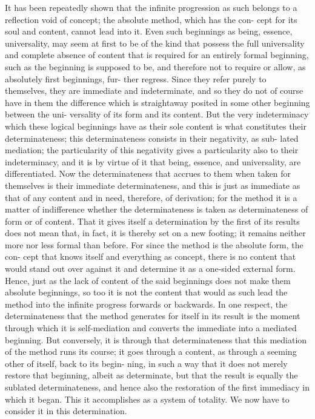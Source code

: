 It has been repeatedly shown that the infinite progression as such belongs
to a reflection void of concept; the absolute method, which has the con-
cept for its soul and content, cannot lead into it. Even such beginnings as
being, essence, universality, may seem at first to be of the kind that possess
the full universality and complete absence of content that is required for
an entirely formal beginning, such as the beginning is supposed to be,
and therefore not to require or allow, as absolutely first beginnings, fur-
ther regress. Since they refer purely to themselves, they are immediate and
indeterminate, and so they do not of course have in them the difference
which is straightaway posited in some other beginning between the uni-
versality of its form and its content. But the very indeterminacy which
these logical beginnings have as their sole content is what constitutes their
determinateness; this determinateness consists in their negativity, as sub-
lated mediation; the particularity of this negativity gives a particularity
also to their indeterminacy, and it is by virtue of it that being, essence, and
universality, are differentiated. Now the determinateness that accrues to
them when taken for themselves is their immediate determinateness, and
this is just as immediate as that of any content and in need, therefore,
of derivation; for the method it is a matter of indifference whether the
determinateness is taken as determinateness of form or of content. That it
gives itself a determination by the first of its results does not mean that,
in fact, it is thereby set on a new footing; it remains neither more nor less
formal than before. For since the method is the absolute form, the con-
cept that knows itself and everything as concept, there is no content that
would stand out over against it and determine it as a one-sided external
form. Hence, just as the lack of content of the said beginnings does not
make them absolute beginnings, so too it is not the content that would
as such lead the method into the infinite progress forwards or backwards.
In one respect, the determinateness that the method generates for itself in
its result is the moment through which it is self-mediation and converts
the immediate into a mediated beginning. But conversely, it is through that
determinateness that this mediation of the method runs its course; it goes
through a content, as through a seeming other of itself, back to its begin-
ning, in such a way that it does not merely restore that beginning, albeit as
determinate, but that the result is equally the sublated determinateness, and
hence also the restoration of the first immediacy in which it began. This
it accomplishes as a system of totality. We now have to consider it in this
determination.

